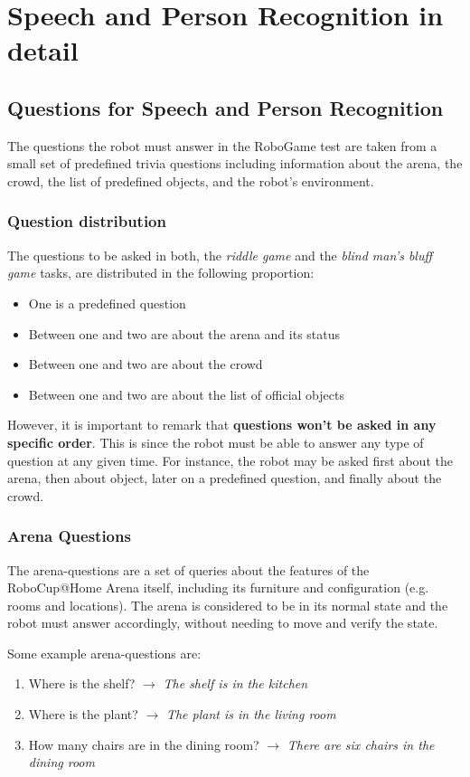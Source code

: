 \chapter{Speech and Person Recognition in detail}
\label{chap:robogame-appendix}

\section{Questions for Speech and Person Recognition}
The questions the robot must answer in the RoboGame test are taken from a small set of predefined trivia questions including information about the arena, the crowd, the list of predefined objects, and the robot's environment.

\subsection{Question distribution}
The questions to be asked in both, the \textit{riddle game} and the \textit{blind man's bluff game} tasks, are distributed in the following proportion:
\begin{itemize}
    \item One is a predefined question
    \item Between one and two are about the arena and its status
    \item Between one and two are about the crowd
    \item Between one and two are about the list of official objects
\end{itemize}
However, it is important to remark that \textbf{questions won't be asked in any specific order}. This is since the robot must be able to answer any type of question at any given time. For instance, the robot may be asked first about the arena, then about object, later on a predefined question, and finally about the crowd.

\subsection{Arena Questions}
The arena-questions are a set of queries about the features of the RoboCup@Home Arena itself, including its furniture and configuration (e.g. rooms and locations). The arena is considered to be in its normal state and the robot must answer accordingly, without needing to move and verify the state.

Some example arena-questions are:
\begin{enumerate}
    \item Where is the shelf? $\rightarrow$ \textit{The shelf is in the kitchen}
    \item Where is the plant? $\rightarrow$ \textit{The plant is in the living room}
    \item How many chairs are in the dining room? $\rightarrow$ \textit{There are six chairs in the dining room}
\end{enumerate}

